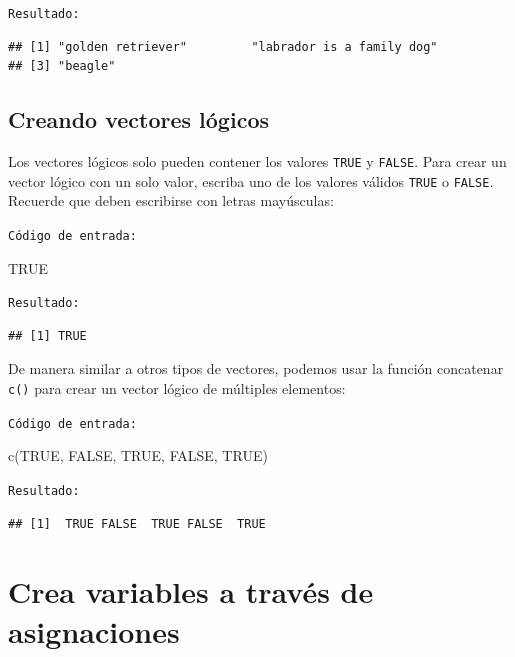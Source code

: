 \documentclass[
]{book}
\newenvironment{Shaded}{\begin{snugshade}}{\end{snugshade}}
\newcommand{\ConstantTok}[1]{\textcolor[rgb]{0.00,0.00,0.00}{#1}}
\newcommand{\FunctionTok}[1]{\textcolor[rgb]{0.00,0.00,0.00}{#1}}
\newcommand{\NormalTok}[1]{#1}
\begin{document}
\texttt{Resultado:}

\begin{verbatim}
## [1] "golden retriever"         "labrador is a family dog"
## [3] "beagle"
\end{verbatim}

\hypertarget{creando-vectores-luxf3gicos}{%
\subsection{Creando vectores lógicos}\label{creando-vectores-luxf3gicos}}

Los vectores lógicos solo pueden contener los valores \texttt{TRUE} y \texttt{FALSE}. Para crear un vector lógico con un solo valor, escriba uno de los valores válidos \texttt{TRUE} o \texttt{FALSE}. Recuerde que deben escribirse con letras mayúsculas:

\texttt{Código\ de\ entrada:}

\begin{Shaded}
\begin{Highlighting}[]
\ConstantTok{TRUE}
\end{Highlighting}
\end{Shaded}

\texttt{Resultado:}

\begin{verbatim}
## [1] TRUE
\end{verbatim}

De manera similar a otros tipos de vectores, podemos usar la función concatenar \texttt{c()} para crear un vector lógico de múltiples elementos:

\texttt{Código\ de\ entrada:}

\begin{Shaded}
\begin{Highlighting}[]
\FunctionTok{c}\NormalTok{(}\ConstantTok{TRUE}\NormalTok{, }\ConstantTok{FALSE}\NormalTok{, }\ConstantTok{TRUE}\NormalTok{, }\ConstantTok{FALSE}\NormalTok{, }\ConstantTok{TRUE}\NormalTok{)   }
\end{Highlighting}
\end{Shaded}

\texttt{Resultado:}

\begin{verbatim}
## [1]  TRUE FALSE  TRUE FALSE  TRUE
\end{verbatim}

\hypertarget{crea-variables-a-travuxe9s-de-asignaciones}{%
\section{Crea variables a través de asignaciones}\label{crea-variables-a-travuxe9s-de-asignaciones}}
\end{document}
